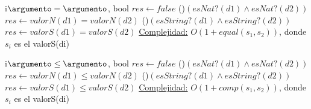 \begin{Algoritmos}

\begin{algoritmo}{i$\argumento = \argumento$}{, }{bool}
	$res \gets false $ 
    \If(){$(esNat?(d1) \wedge esNat?(d2))$}{
			$res \gets valorN(d1) = valorN(d2) $ 
		}
    \If(){$(esString?(d1) \wedge esString?(d2))$}{
			$res \gets valorS(d1) = valorS(d2) $ 
		} 
    \medskip
	\underline{Complejidad:} $O(1 + equal(s_1,s_2))$, donde $s_i$ es el valorS(di)
\end{algoritmo}    

\begin{algoritmo}{i$\argumento \leq \argumento$}{, }{bool}
	$res \gets false $ 
    \If(){$(esNat?(d1) \wedge esNat?(d2))$}{
			$res \gets valorN(d1) \leq valorN(d2) $ 
		}
    \If(){$(esString?(d1) \wedge esString?(d2))$}{
			$res \gets valorS(d1) \leq valorS(d2) $ 
		} 
    \medskip
	\underline{Complejidad:} $O(1 + comp(s_1,s_2))$, donde $s_i$ es el valorS(di)
\end{algoritmo}    

\end{Algoritmos}